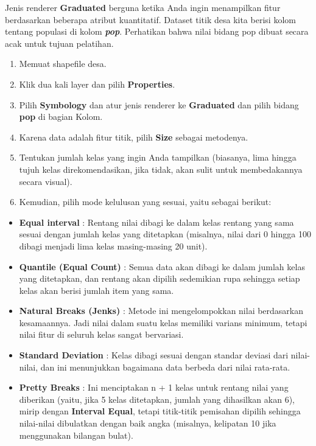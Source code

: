 \documentclass[]{book}
\begin{document}
Jenis renderer \textbf{Graduated} berguna ketika Anda ingin menampilkan fitur berdasarkan beberapa atribut kuantitatif. Dataset titik desa kita berisi kolom tentang populasi di kolom \textbf{\emph{pop}}. Perhatikan bahwa nilai bidang pop dibuat secara acak untuk tujuan pelatihan.

\begin{enumerate}
\def\labelenumi{\arabic{enumi}.}
\item
  Memuat shapefile desa.
\item
  Klik dua kali layer dan pilih \textbf{Properties}.
\item
  Pilih \textbf{Symbology} dan atur jenis renderer ke \textbf{Graduated} dan pilih bidang \textbf{pop} di bagian Kolom.
\item
  Karena data adalah fitur titik, pilih \textbf{Size} sebagai metodenya.
\item
  Tentukan jumlah kelas yang ingin Anda tampilkan (biasanya, lima hingga tujuh kelas direkomendasikan, jika tidak, akan sulit untuk membedakannya secara visual).
\item
  Kemudian, pilih mode kelulusan yang sesuai, yaitu sebagai berikut:
\end{enumerate}

\begin{itemize}
\item
  \textbf{Equal interval} : Rentang nilai dibagi ke dalam kelas rentang yang sama sesuai dengan jumlah kelas yang ditetapkan (misalnya, nilai dari 0 hingga 100 dibagi menjadi lima kelas masing-masing 20 unit).
\item
  \textbf{Quantile (Equal Count)} : Semua data akan dibagi ke dalam jumlah kelas yang ditetapkan, dan rentang akan dipilih sedemikian rupa sehingga setiap kelas akan berisi jumlah item yang sama.
\item
  \textbf{Natural Breaks (Jenks)} : Metode ini mengelompokkan nilai berdasarkan kesamaannya. Jadi nilai dalam suatu kelas memiliki varians minimum, tetapi nilai fitur di seluruh kelas sangat bervariasi.
\item
  \textbf{Standard Deviation} : Kelas dibagi sesuai dengan standar deviasi dari nilai-nilai, dan ini menunjukkan bagaimana data berbeda dari nilai rata-rata.
\item
  \textbf{Pretty Breaks} : Ini menciptakan n + 1 kelas untuk rentang nilai yang diberikan (yaitu, jika 5 kelas ditetapkan, jumlah yang dihasilkan akan 6), mirip dengan \textbf{Interval Equal}, tetapi titik-titik pemisahan dipilih sehingga nilai-nilai dibulatkan dengan baik angka (misalnya, kelipatan 10 jika menggunakan bilangan bulat).
\end{itemize}
\end{document}

